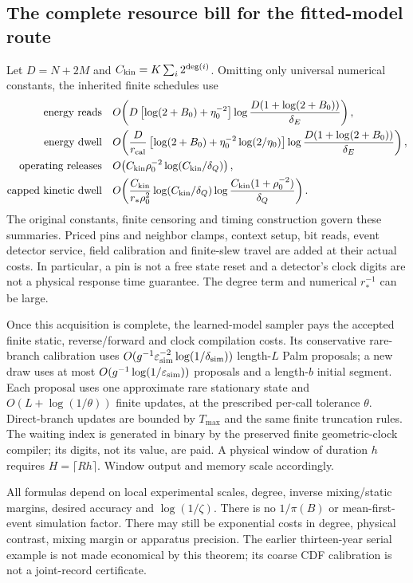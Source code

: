 \subsection{The complete resource bill for the fitted-model route}
Let $D=N+2M$ and $C_{\rm kin}=K\sum_i2^{\deg(i)}$. Omitting only
universal numerical constants, the inherited finite schedules use
\begin{align}
\text{energy reads}\quad&
O\!\left(D\left[\log(2+B_0)+\eta_0^{-2}\right]
                 \log\frac{D(1+\log(2+B_0))}{\delta_E}\right),\\
\text{energy dwell}\quad&
O\!\left(\frac D{r_{\rm cal}}
\left[\log(2+B_0)+\eta_0^{-2}\log(2/\eta_0)\right]
\log\frac{D(1+\log(2+B_0))}{\delta_E}\right),\\
\text{operating releases}\quad&
O\!\left(C_{\rm kin}\rho_0^{-2}
                      \log(C_{\rm kin}/\delta_Q)\right),\\
\text{capped kinetic dwell}\quad&
O\!\left(\frac{C_{\rm kin}}{r_*\rho_0^2}
\log(C_{\rm kin}/\delta_Q)
\log\frac{C_{\rm kin}(1+\rho_0^{-2})}{\delta_Q}\right).
\label{eq:fitCosts}
\end{align}
The original constants, finite censoring and timing construction govern
these summaries. Priced pins and neighbor clamps, context setup, bit
reads, event detector service, field calibration and finite-slew travel
are added at their actual costs. In particular, a pin is not a free
state reset and a detector's clock digits are not a physical response
time guarantee. The degree term and numerical $r_*^{-1}$ can be large.

Once this acquisition is complete, the learned-model sampler pays the
accepted finite static, reverse/forward and clock compilation costs.
Its conservative rare-branch calibration uses
$O(g^{-1}\varepsilon_{\rm sim}^{-2}\log(1/\delta_{\rm sim}))$
length-$L$ Palm proposals; a new draw uses at most
$O(g^{-1}\log(1/\varepsilon_{\rm sim}))$ proposals and a length-$b$
initial segment. Each proposal uses one approximate rare stationary
state and $O(L+\log(1/\theta))$ finite updates, at the prescribed
per-call tolerance $\theta$. Direct-branch updates are bounded by
$T_{\max}$ and the same finite truncation rules. The waiting index is
generated in binary by the preserved finite geometric-clock compiler;
its digits, not its value, are paid. A physical window of duration $h$
requires $H=\lceil Rh\rceil$. Window output and memory scale accordingly.

All formulas depend on local experimental scales, degree, inverse
mixing/static margins, desired accuracy and $\log(1/\zeta)$. There is
no $1/\pi(B)$ or mean-first-event simulation factor. There may still be
exponential costs in degree, physical contrast, mixing margin or
apparatus precision. The earlier thirteen-year serial example is not
made economical by this theorem; its coarse CDF calibration is not a
joint-record certificate.

